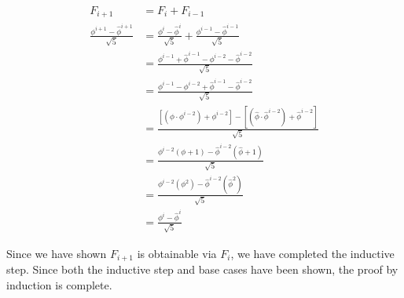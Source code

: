 \begin{align}
	F_{i + 1} &= F_{i} + F_{i - 1} \\
	\frac{\phi^{i + 1} - \hat{\phi}^{i + 1}}{\sqrt{5}} 
	&=  
	\frac{\phi^{i} - \hat{\phi}^{i}}{\sqrt{5}} +
	\frac{\phi^{i - 1} - \hat{\phi}^{i - 1}}{\sqrt{5}} \\
	&=
	\frac{\phi^{i - 1} + \hat{\phi}^{i - 1} - \phi^{i - 2} - \hat{\phi}^{i - 2}}{\sqrt{5}} \\
	&=
	\frac{\phi^{i - 1} - \phi^{i - 2} + \hat{\phi}^{i - 1} - \hat{\phi}^{i - 2}}{\sqrt{5}} \\
	&=
	\frac{\left[(\phi \cdot \phi^{i -2}) + \phi^{i - 2}\right] - \left[(\hat{\phi} \cdot \hat{\phi}^{i - 2}) + \hat{\phi}^{i - 2}\right]}{\sqrt{5}} \\
	&=
	\frac{\phi^{i - 2} \left( \phi + 1 \right) - \hat{\phi}^{i - 2} \left( \hat{\phi} + 1 \right)}{\sqrt{5}}\\
	&=
	\frac{\phi^{i - 2}\left( \phi^2 \right) - \hat{\phi}^{i - 2} \left( \hat{\phi}^2 \right)}{\sqrt{5}} \\
	&= 
	\frac{\phi^i - \hat{\phi}^i}{\sqrt{5}}
\end{align}

Since we have shown $F_{i + 1}$ is obtainable via $F_i$, we have completed the inductive step. Since both the inductive step and base cases have been shown, the proof by induction is complete.
